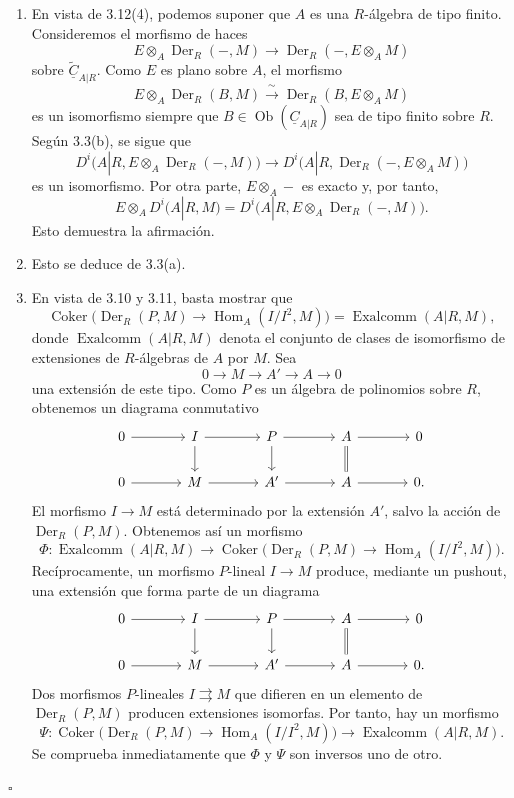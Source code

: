 \begin{enumerate}[label=(\arabic*)]
\item En vista de 3.12(4), podemos suponer que $A$ es una
$R$-álgebra de tipo finito. Consideremos el morfismo de haces
\[
 E\otimes_A\operatorname{Der}_R(-,M)
 \longrightarrow
 \operatorname{Der}_R(-,E\otimes_AM)
\]
sobre $\widetilde{\underline C}_{A|R}$. Como $E$ es plano sobre $A$,
el morfismo
\[
 E\otimes_A\operatorname{Der}_R(B,M)
 \xrightarrow{\ \sim\ }
 \operatorname{Der}_R(B,E\otimes_AM)
\]
es un isomorfismo siempre que
$B\in\operatorname{Ob}(\underline C_{A|R})$ sea de tipo finito sobre
$R$. Según 3.3(b), se sigue que
\[
 D^i\bigl(A|R,E\otimes_A\operatorname{Der}_R(-,M)\bigr)
 \longrightarrow
 D^i\bigl(A|R,\operatorname{Der}_R(-,E\otimes_AM)\bigr)
\]
es un isomorfismo. Por otra parte, $E\otimes_A-$ es exacto y, por tanto,
\[
 E\otimes_AD^i(A|R,M)
 =D^i\bigl(A|R,E\otimes_A\operatorname{Der}_R(-,M)\bigr).
\]
Esto demuestra la afirmación.

\item Esto se deduce de 3.3(a).


\item En vista de 3.10 y 3.11, basta mostrar que
\[
 \operatorname{Coker}\bigl(
 \operatorname{Der}_R(P,M)\longrightarrow
 \operatorname{Hom}_A(I/I^2,M)\bigr)
 =\operatorname{Exalcomm}(A|R,M),
\]
donde $\operatorname{Exalcomm}(A|R,M)$ denota el conjunto de clases de
isomorfismo de extensiones de $R$-álgebras de $A$ por $M$. Sea
\[
 0\longrightarrow M\longrightarrow A'\longrightarrow A
 \longrightarrow0
\]
una extensión de este tipo. Como $P$ es un álgebra de polinomios sobre
$R$, obtenemos un diagrama conmutativo
\[
\begin{tikzcd}[column sep=large]
0 \arrow[r] & I \arrow[r] \arrow[d]
& P \arrow[r] \arrow[d]
& A \arrow[r] \arrow[d,equal] & 0 \\
0 \arrow[r] & M \arrow[r]
& A' \arrow[r]
& A \arrow[r] & 0.
\end{tikzcd}
\]
El morfismo $I\longrightarrow M$ está determinado por la extensión
$A'$, salvo la acción de $\operatorname{Der}_R(P,M)$. Obtenemos así un
morfismo
\[
 \Phi:\operatorname{Exalcomm}(A|R,M)
 \longrightarrow
 \operatorname{Coker}\bigl(
 \operatorname{Der}_R(P,M)\longrightarrow
 \operatorname{Hom}_A(I/I^2,M)\bigr).
\]
Recíprocamente, un morfismo $P$-lineal $I\longrightarrow M$ produce,
mediante un pushout, una extensión que forma parte de un diagrama
\[
\begin{tikzcd}[column sep=large]
0 \arrow[r] & I \arrow[r] \arrow[d]
& P \arrow[r] \arrow[d]
& A \arrow[r] \arrow[d,equal] & 0 \\
0 \arrow[r] & M \arrow[r]
& A' \arrow[r]
& A \arrow[r] & 0.
\end{tikzcd}
\]
Dos morfismos $P$-lineales $I\rightrightarrows M$ que difieren en un
elemento de $\operatorname{Der}_R(P,M)$ producen extensiones isomorfas.
Por tanto, hay un morfismo
\[
 \Psi:\operatorname{Coker}\bigl(
 \operatorname{Der}_R(P,M)\longrightarrow
 \operatorname{Hom}_A(I/I^2,M)\bigr)
 \longrightarrow\operatorname{Exalcomm}(A|R,M).
\]
Se comprueba inmediatamente que $\Phi$ y $\Psi$ son inversos uno de
otro.
\end{enumerate}
\hfill$\square$
